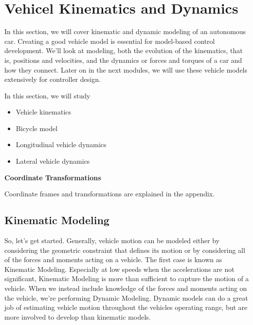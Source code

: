\section{Vehicel Kinematics and Dynamics}
\label{vehicle_kinematics_and_dynamics}

In this section, we will cover kinematic and dynamic modeling of an autonomous car. 
Creating a good vehicle model is essential for model-based control development. 
We'll look at modeling, both the evolution of the kinematics, that is, positions and velocities, and the dynamics or forces and torques of a car and how they connect. 
Later on in the next modules, we will use these vehicle models extensively for controller design. 


In this section, we will study

\begin{itemize}
\item Vehicle kinematics
\item Bicycle model
\item Longitudinal vehicle dynamics
\item Lateral vehicle dynamics
\end{itemize}

\begin{framed}
\theoremstyle{remark}
\begin{remark}{\textbf{Coordinate Transformations}}

Coordinate frames and transformations are explained in the appendix.
\end{remark}
\end{framed}

 
\subsection{Kinematic Modeling}
\label{kinematic_modeling}

So, let's get started. Generally, vehicle motion can be modeled either by considering the geometric constraint that defines its motion or by considering all of the forces and moments acting on a vehicle. 
The first case is known as Kinematic Modeling. Especially at low speeds when the accelerations are not significant, Kinematic Modeling is more than sufficient to capture the motion of a vehicle. When we instead include knowledge of the forces and moments acting on the vehicle, we're performing Dynamic Modeling. 
Dynamic models can do a great job of estimating vehicle motion throughout the vehicles operating range, but are more involved to develop than kinematic models. 

